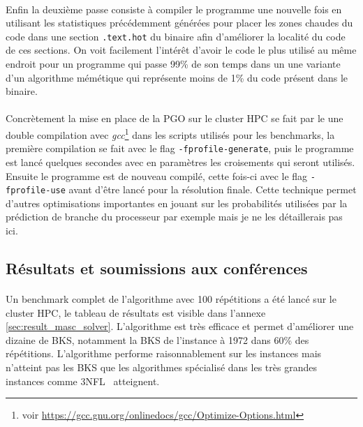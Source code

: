\documentclass[a4paper,11pt,twoside,french,report]{../common/simplem}
\begin{document}
				\paragraph*{}
					Enfin la deuxième passe consiste à compiler le programme une nouvelle fois en utilisant les statistiques précédemment générées pour placer les zones chaudes du code dans une section \texttt{.text.hot} du binaire afin d'améliorer la localité du code de ces sections. On voit facilement l'intérêt d'avoir le code le plus utilisé au même endroit pour un programme qui passe 99\% de son temps dans un une variante d'un algorithme mémétique qui représente moins de 1\% du code présent dans le binaire.
				\paragraph*{}
					Concrètement la mise en place de la \gls{PGO} sur le cluster \gls{HPC} se fait par le une double compilation avec \textit{gcc}\footnote{voir \url{https://gcc.gnu.org/onlinedocs/gcc/Optimize-Options.html}} dans les scripts utilisés pour les benchmarks, la première compilation se fait avec le flag \texttt{-fprofile-generate}, puis le programme est lancé quelques secondes avec en paramètres les croisements qui seront utilisés. Ensuite le programme est de nouveau compilé, cette fois-ci avec le flag \texttt{-fprofile-use} avant d'être lancé pour la résolution finale. Cette technique permet d'autres optimisations importantes en jouant sur les probabilités utilisées par la prédiction de branche du processeur par exemple mais je ne les détaillerais pas ici.
			\subsection{Résultats et soumissions aux conférences}\label{sec:conferences}
				\paragraph*{}
					Un benchmark complet de l'algorithme avec 100 répétitions a été lancé sur le cluster \gls{HPC}, le tableau de résultats est visible dans l'annexe \ref{sec:result_masc_solver}. L'algorithme est très efficace et permet d'améliorer une dizaine de \gls{BKS}, notamment la \gls{BKS} de l'instance  à 1972 dans 60\% des répétitions. L'algorithme performe raisonnablement sur les instances  mais n'atteint pas les \gls{BKS} que les algorithmes spécialisé dans les très grandes instances comme 3NFL~\cite{Yagiura2006} atteignent.
\end{document}
